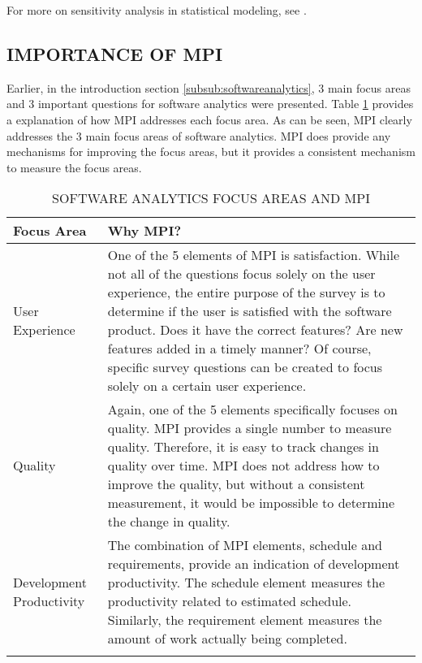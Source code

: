 \documentclass[SDSUThesis.tex]{subfiles}
\begin{document}
For more on sensitivity analysis in statistical modeling, see \cite{Saltelli2000}.

\subsection{IMPORTANCE OF MPI}

Earlier, in the introduction section \ref{subsub:softwareanalytics}, 3 main focus areas and 3 important questions for software
analytics were presented.  Table \ref{tab:focusareas} provides a explanation of how MPI addresses
each focus area.  
As can be seen, MPI clearly addresses the 3 main focus areas of software analytics.  MPI does provide
any mechanisms for improving the focus areas, but it provides a consistent mechanism to measure
the focus areas. 

\begin{longtable}{p{3cm}p{11cm}}

\toprule%
 \centering%
 {\bfseries Focus Area}
 & {\bfseries Why MPI?} \\

\cmidrule[0.4pt](r{0.125em}){1-1}%
\cmidrule[0.4pt](lr{0.125em}){2-2}%
\endhead

User Experience & One of the 5 elements of MPI is satisfaction.  While not all of the questions focus solely on the user experience, the entire purpose of the survey is to determine if the user is satisfied
with the software product. Does it have the correct features? Are new features added in a timely manner? Of course, specific survey questions can be created to focus solely on a certain user experience. \\
\myrowcolour%
Quality & Again, one of the 5 elements specifically focuses on quality.  MPI provides a single number
to measure quality.  Therefore, it is easy to track changes in quality over time.  MPI does not address
how to improve the quality, but without a consistent measurement, it would be impossible to determine the change in quality. \\
Development Productivity & The combination of MPI elements, schedule and requirements, provide an 
indication of development productivity. The schedule element measures the productivity
related to estimated schedule. Similarly, the requirement element measures the amount of
work actually being completed.  \\

\bottomrule

\caption{SOFTWARE ANALYTICS FOCUS AREAS AND MPI}
\label{tab:focusareas}
\end{longtable}
\end{document}
